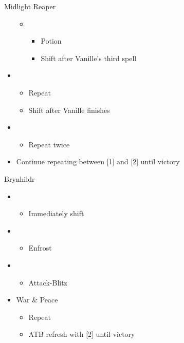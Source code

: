 \begin{battle}{Midlight Reaper}
\begin{itemize}
\begin{itemize}
\begin{itemize}
        \end{itemize}
        \item \sixth
        \begin{itemize}
            \item Potion
            \item Shift after Vanille's third spell
        \end{itemize}
    \end{itemize}
    \item \first
    \begin{itemize}
        \item Repeat
        \item Shift after Vanille finishes
    \end{itemize}
    \item \second
    \begin{itemize}
        \item Repeat twice
    \end{itemize}
    \item Continue repeating between [1] and [2] until victory
\end{itemize}
\end{battle}

\begin{battle}{Brynhildr}
\begin{itemize}
    \item \first
    \begin{itemize}
        \item Immediately shift
    \end{itemize}
    \item \third
    \begin{itemize}
        \item Enfrost
    \end{itemize}
    \item \first
    \begin{itemize}
        \item Attack-Blitz
    \end{itemize}
    \item War \& Peace
    \begin{itemize}
        \item Repeat
        \item ATB refresh with [2] until victory
    \end{itemize}
\end{itemize}
\end{battle}
